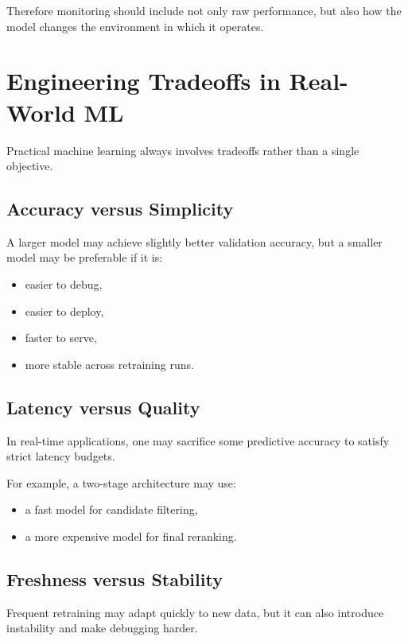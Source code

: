 \medskip

\noindent
Therefore monitoring should include not only raw performance, but also how the model changes the environment in which it operates.

\section{Engineering Tradeoffs in Real-World ML}

Practical machine learning always involves tradeoffs rather than a single objective.

\subsection{Accuracy versus Simplicity}

A larger model may achieve slightly better validation accuracy, but a smaller model may be preferable if it is:
\begin{itemize}
    \item easier to debug,
    \item easier to deploy,
    \item faster to serve,
    \item more stable across retraining runs.
\end{itemize}

\subsection{Latency versus Quality}

In real-time applications, one may sacrifice some predictive accuracy to satisfy strict latency budgets.

\medskip

\noindent
For example, a two-stage architecture may use:
\begin{itemize}
    \item a fast model for candidate filtering,
    \item a more expensive model for final reranking.
\end{itemize}

\subsection{Freshness versus Stability}

Frequent retraining may adapt quickly to new data, but it can also introduce instability and make debugging harder.

